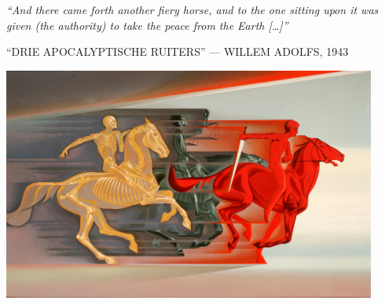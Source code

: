 \begin{pages}
\end{pages} 
\Pages

\clearpage
\thispagestyle{empty}
\null\vfill
\settowidth{}
\begin{center}
\parbox{\longest}{%
  \raggedright{\huge\itshape%
    ``And there came forth another fiery horse, and to the one sitting upon it was given (the authority) to take the peace from the Earth […]'' \par\bigskip
  }
  \raggedleft\Large\MakeUppercase{``Drie apocalyptische ruiters'' — Willem Adolfs, 1943}\par%
}
\vfill\vfill
\clearpage\newpage
\end{center}
\newpage
\thispagestyle{empty}
\begin{center}
	\includegraphics[angle=90, width=0.92\textwidth]{images/illustrations/adolfshorsemen.jpg}
\end{center}